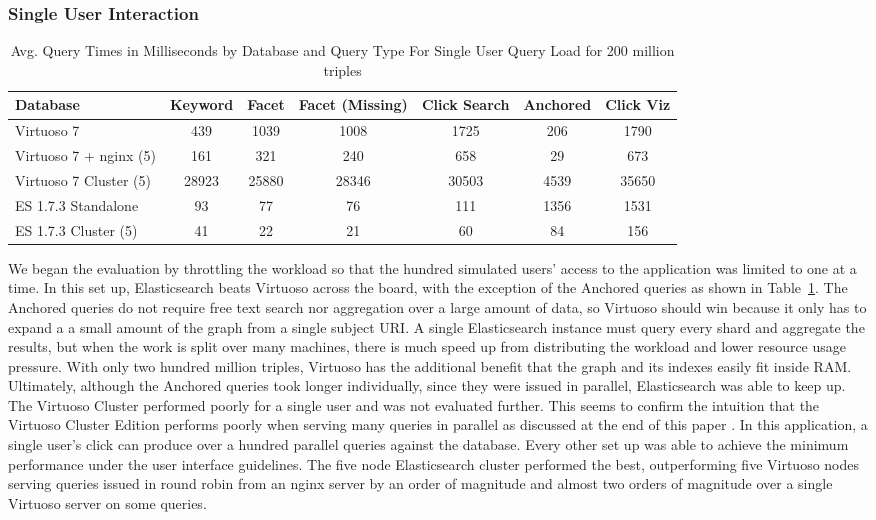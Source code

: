 \subsubsection{Single User Interaction}
 \begin{table}
 \centering
 \footnotesize{
    \begin{tabular}{ l||c|c|c|c|c|c }
        Database & Keyword & Facet & Facet (Missing) & Click Search & Anchored & Click Viz \\ \hline 
        Virtuoso 7 & 439 & 1039 & 1008 & 1725 & 206 &  1790 \\ 
        Virtuoso 7 + nginx (5) & 161 & 321 & 240 & 658 & 29 &  673 \\ 
        Virtuoso 7 Cluster (5) & 28923 & 25880 & 28346 & 30503 & 4539 & 35650\\
        ES 1.7.3 Standalone & 93 & 77 & 76 & 111 & 1356 & 1531 \\ 
        ES 1.7.3 Cluster (5) & 41 & 22 & 21 & 60 & 84 & 156 \\ 
    \end{tabular} 
    }
    \caption{Avg. Query Times in Milliseconds by Database and Query Type For Single User Query Load for 200 million triples}
    \label{table:qt_single_user_200m}
    
\end{table}
We began the evaluation by throttling the workload so that the hundred simulated users' access to the application was limited to one at a time.
In this set up, Elasticsearch beats Virtuoso across the board, with the exception of the Anchored queries as shown in Table~\ref{table:qt_single_user_200m}.  
The Anchored queries do not require free text search nor aggregation over a large amount of data, so Virtuoso should win because it only has to expand a a small amount of the graph from a single subject URI.
A single Elasticsearch instance must query every shard and aggregate the results, but when the work is split over many machines, there is much speed up from distributing the workload and lower resource usage pressure.   
With only two hundred million triples, Virtuoso has the additional benefit that the graph and its indexes easily fit inside RAM.
Ultimately, although the Anchored queries took longer individually, since they were issued in parallel, Elasticsearch was able to keep up.
The Virtuoso Cluster performed poorly for a single user and was not evaluated further. 
This seems to confirm the intuition that the Virtuoso Cluster Edition performs poorly when serving many queries in parallel as discussed at the end of this paper \cite{harthlinked}.  
In this application, a single user's click can produce over a hundred parallel queries against the database. 
Every other set up was able to achieve the minimum performance under the user interface guidelines. 
The five node Elasticsearch cluster performed the best, outperforming five Virtuoso nodes serving queries issued in round robin from an nginx server by an order of magnitude and almost two orders of magnitude over a single Virtuoso server on some queries. 

